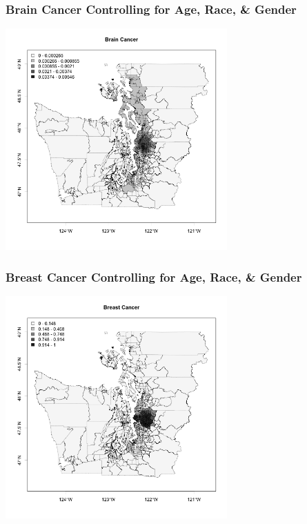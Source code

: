 \documentclass[handout]{beamer}
\begin{document}
\begin{frame}[fragile]
\frametitle{Brain Cancer Controlling for Age, Race, \& Gender}
\begin{center}
\includegraphics[width=8.5cm]{figure/brain.png}
\end{center}
\end{frame}


\begin{frame}[fragile]
\frametitle{Breast Cancer Controlling for Age, Race, \& Gender}
\begin{center}
\includegraphics[width=8.5cm]{figure/breast.png}
\end{center}
\end{frame}
\end{document}
